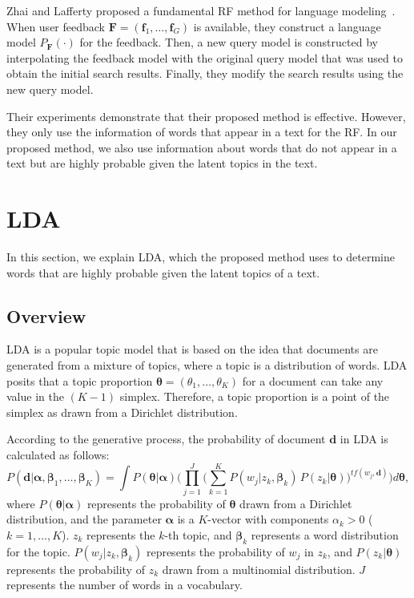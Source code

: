 \documentclass[english]{jnlp_1.4_rep}
\begin{document}
Zhai and Lafferty proposed a fundamental RF method for language
modeling~\cite{Zhai2001}. When user feedback $\bm{F} = (\bm{f}_{1},
\dots, \bm{f}_{G})$ is available, they construct a language model
$P_{\bm{F}}(\cdot)$ for the feedback. Then, a new query model is
constructed by interpolating the feedback model with the original query
model that was used to obtain the initial search results. Finally, they
modify the search results using the new query model.

Their experiments demonstrate that their proposed method is
effective. However, they only use the information of words that appear
in a text for the RF. In our proposed method, we also use information
about words that do not appear in a text but are highly probable given
the latent topics in the text.



\section{LDA}
\label{sec:lda}

In this section, we explain LDA, which the proposed method uses to
determine words that are highly probable given the latent topics of a
text.


\subsection{Overview}

LDA \cite{Blei2003} is a popular topic model that is based on the idea
that documents are generated from a mixture of topics, where a topic is
a distribution of words. LDA posits that a topic proportion $\bm{\theta}
= (\theta_{1}, \dots, \theta_{K})$ for a document can take any value in
the $(K - 1)$ simplex. Therefore, a topic proportion is a point of the
simplex as drawn from a Dirichlet distribution.

According to the generative process, the probability of document
$\bm{d}$ in LDA is calculated as follows:
\begin{equation}
 P(\bm{d}|\bm{\alpha},\bm{\beta}_{1}, \dots, \bm{\beta}_{K})
 = \int
 P(\bm{\theta}|\bm{\alpha})
 \Biggl(
 \prod_{j=1}^{J}
 \biggl(
 \sum_{k=1}^{K}
 P(w_{j}|z_{k},\bm{\beta}_{k}) \,
 P(z_{k}|\bm{\theta})
 \biggr)
 ^{tf(w_{j},\bm{d})}
 \Biggr)
 d\bm{\theta},
 \label{equ:lda}
\end{equation}
where $P(\bm{\theta}|\bm{\alpha})$ represents the probability of
$\bm{\theta}$ drawn from a Dirichlet distribution, and the parameter
$\bm{\alpha}$ is a $K$-vector with components $\alpha_{k} > 0$ ($k = 1,
\dots, K$). $z_{k}$ represents the $k$-th topic, and $\bm{\beta}_{k}$
represents a word distribution for the
topic. $P(w_{j}|z_{k},\bm{\beta}_{k})$ represents the probability of
$w_{j}$ in $z_{k}$, and $P(z_{k}|\bm{\theta})$ represents the
probability of $z_{k}$ drawn from a multinomial distribution. $J$
represents the number of words in a vocabulary.
\end{document}
